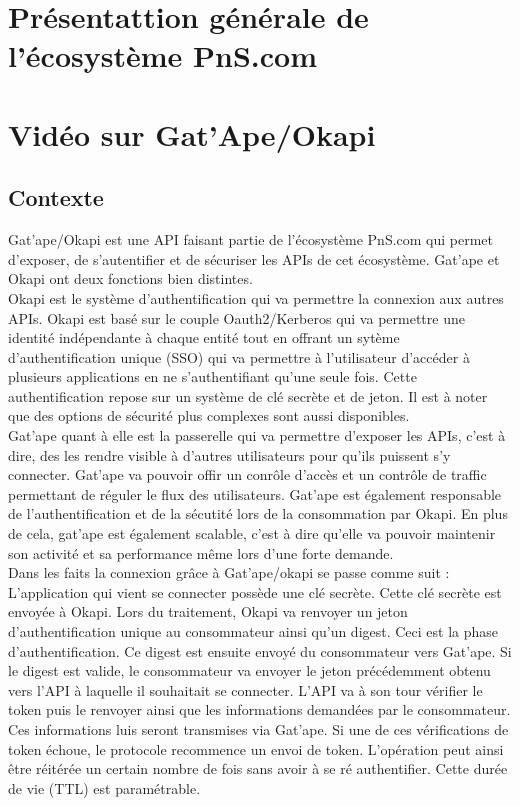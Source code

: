 \section{Présentattion générale de l'écosystème PnS.com}


\section{Vidéo sur Gat'Ape/Okapi}

\subsection{Contexte}
Gat'ape/Okapi est une API faisant partie de l'écosystème PnS.com qui permet d'exposer, de s'autentifier et de sécuriser les APIs de cet écosystème. Gat'ape et Okapi ont deux fonctions bien distintes.\\

Okapi est le système d'authentification qui va permettre la connexion aux autres APIs. Okapi est basé sur le couple Oauth2/Kerberos qui va permettre une identité indépendante à chaque entité tout en offrant un sytème d'authentification unique (SSO) qui va permettre à l'utilisateur d'accéder à plusieurs applications en ne s'authentifiant qu'une seule fois. Cette authentification repose sur un système de clé secrète et de jeton. Il est à noter que des options de sécurité plus complexes sont aussi disponibles.\\

Gat'ape quant à elle est la passerelle qui va permettre d'exposer les APIs, c'est à dire, des les rendre visible à d'autres utilisateurs pour qu'ils puissent s'y connecter. Gat'ape va pouvoir offir un conrôle d'accès et un contrôle de traffic permettant de réguler le flux des utilisateurs. Gat'ape est également responsable  de l'authentification et de la sécutité lors de la consommation par Okapi. En plus de cela, gat'ape est également scalable, c'est à dire qu'elle va pouvoir maintenir son activité et sa performance même lors d'une forte demande.\\

Dans les faits la connexion grâce à Gat'ape/okapi se passe comme suit : 
L'application qui vient se connecter possède une clé secrète. Cette clé secrète est envoyée à Okapi. Lors du traitement, Okapi va renvoyer un jeton d'authentification unique au consommateur ainsi qu'un digest. Ceci est la phase d'authentification.  Ce digest est ensuite envoyé du consommateur vers Gat'ape. Si le digest est valide, le consommateur va envoyer le jeton précédemment obtenu vers l'API à laquelle il souhaitait se connecter. L'API va à son tour vérifier le token puis le renvoyer ainsi que les informations demandées par le consommateur. Ces informations luis seront transmises via Gat'ape. Si une de ces vérifications de token échoue, le protocole recommence un envoi de token. L'opération peut ainsi être réitérée un certain nombre de fois sans avoir à se ré authentifier. Cette durée de vie (TTL) est paramétrable.

